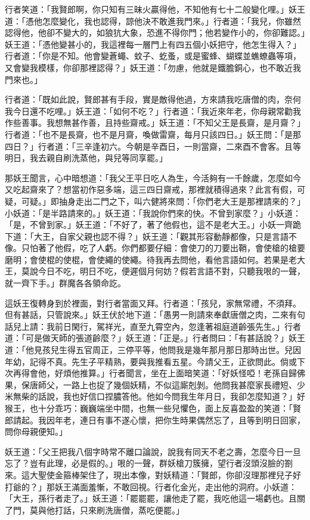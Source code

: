 行者笑道：「我賢郎啊，你只知有三昧火贏得他，不知他有七十二般變化哩。」妖王道：「憑他怎麼變化，我也認得，諒他決不敢進我門來。」行者道：「我兒，你雖然認得他，他卻不變大的，如狼犺大象，恐進不得你門；他若變作小的，你卻難認。」妖王道：「憑他變甚小的，我這裡每一層門上有四五個小妖把守，他怎生得入？」行者道：「你是不知。他會變蒼蠅、蚊子、虼蚤，或是蜜蜂、蝴蝶並蟭蟟蟲等項，又會變我模樣，你卻那裡認得？」妖王道：「勿慮，他就是鐵膽銅心，也不敢近我門來也。」

行者道：「既如此說，賢郎甚有手段，實是敵得他過，方來請我吃唐僧的肉，奈何我今日還不吃哩。」妖王道：「如何不吃？」行者道：「我近來年老，你母親常勸我作些善事。我想無甚作善，且持些齋戒。」妖王道：「不知父王是長齋，是月齋？」行者道：「也不是長齋，也不是月齋，喚做雷齋，每月只該四日。」妖王問：「是那四日？」行者道：「三辛逢初六。今朝是辛酉日，一則當齋，二來酉不會客。且等明日，我去親自刷洗蒸他，與兒等同享罷。」

那妖王聞言，心中暗想道：「我父王平日吃人為生，今活夠有一千餘歲，怎麼如今又吃起齋來了？想當初作惡多端，這三四日齋戒，那裡就積得過來？此言有假，可疑，可疑。」即抽身走出二門之下，叫六健將來問：「你們老大王是那裡請來的？」小妖道：「是半路請來的。」妖王道：「我說你們來的快。不曾到家麼？」小妖道：「是，不曾到家。」妖王道：「不好了，著了他假也，這不是老大王。」小妖一齊跪下道：「大王，自家父親也認不得？」妖王道：「觀其形容動靜都像，只是言語不像。只怕著了他假，吃了人虧。你們都要仔細：會使刀的刀要出鞘，會使槍的槍要磨明；會使棍的使棍，會使繩的使繩。待我再去問他，看他言語如何。若果是老大王，莫說今日不吃，明日不吃，便遲個月何妨？假若言語不對，只聽我哏的一聲，就一齊下手。」群魔各各領命訖。

這妖王復轉身到於裡面，對行者當面又拜。行者道：「孩兒，家無常禮，不須拜。但有甚話，只管說來。」妖王伏於地下道：「愚男一則請來奉獻唐僧之肉，二來有句話兒上請：我前日閑行，駕祥光，直至九霄空內，忽逢著祖庭道齡張先生。」行者道：「可是做天師的張道齡麼？」妖王道：「正是。」行者問曰：「有甚話說？」妖王道：「他見孩兒生得五官周正，三停平等，他問我是幾年那月那日那時出世。兒因年幼，記得不真。先生子平精熟，要與我推看五星。今請父王，正欲問此。倘或下次再得會他，好煩他推算。」行者聞言，坐在上面暗笑道：「好妖怪啞！老孫自歸佛果，保唐師父，一路上也捉了幾個妖精，不似這廝剋剝。他問我甚麼家長禮短、少米無柴的話說，我也好信口捏膿答他。他如今問我生年月日，我卻怎麼知道？」好猴王，也十分乖巧：巍巍端坐中間，也無一些兒懼色，面上反喜盈盈的笑道：「賢郎請起。我因年老，連日有事不遂心懷，把你生時果偶然忘了，且等到明日回家，問你母親便知。」

妖王道：「父王把我八個字時常不離口論說，說我有同天不老之壽，怎麼今日一旦忘了？豈有此理，必是假的。」哏的一聲，群妖槍刀簇擁，望行者沒頭沒臉的劄來。這大聖使金箍棒架住了，現出本像，對妖精道：「賢郎，你卻沒理那裡兒子好打爺的？」那妖王滿面羞慚，不敢回視。行者化金光，走出他的洞府。小妖道：「大王，孫行者走了。」妖王道：「罷罷罷，讓他走了罷，我吃他這一場虧也。且關了門，莫與他打話，只來刷洗唐僧，蒸吃便罷。」

